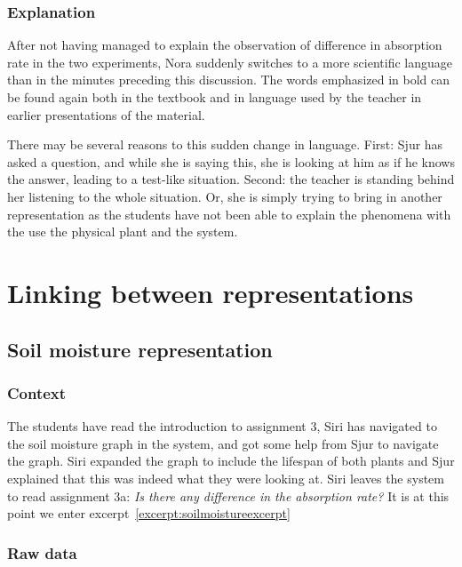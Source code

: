 \subsubsection*{Explanation}
After not having managed to explain the observation of difference in absorption rate in the two experiments, Nora suddenly switches to a more scientific language than in the minutes preceding this discussion. The words emphasized in bold can be found again both in the textbook and in language used by the teacher in earlier presentations of the material. 

There may be several reasons to this sudden change in language. First: Sjur has asked a question, and while she is saying this, she is looking at him as if he knows the answer, leading to a test-like situation. Second: the teacher is standing behind her listening to the whole situation. Or, she is simply trying to bring in another representation as the students have not been able to explain the phenomena with the use the physical plant and the system. 


\section{Linking between representations}
\subsection{Soil moisture representation}


\subsubsection*{Context}
The students have read the introduction to assignment 3, Siri has navigated to the soil moisture graph in the system, and got some help from Sjur to navigate the graph. Siri expanded the graph to include the lifespan of both plants and Sjur explained that this was indeed what they were looking at. Siri leaves the system to read assignment 3a: \emph{Is there any difference in the absorption rate?} It is at this point we enter excerpt~\ref{excerpt:soilmoistureexcerpt}



\subsubsection*{Raw data}

